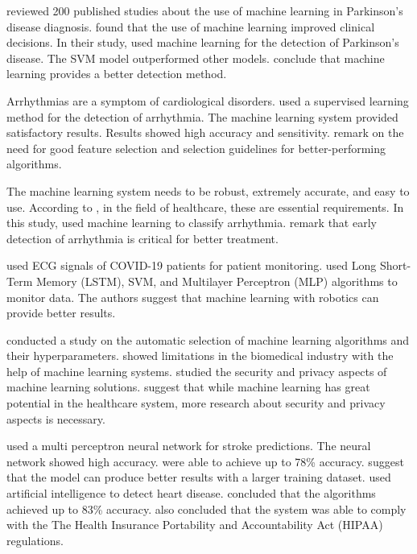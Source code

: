 \documentclass[a4paper,fleqn]{cas-dc}
\begin{document}
\cite*{ref_paper_27} reviewed 200 published studies about the use of machine learning in Parkinson's disease diagnosis. \citeauthor{ref_paper_27} found that the use of machine learning improved clinical decisions. In their study, \cite*{ref_paper_30} used machine learning for the detection of Parkinson's disease. The SVM model outperformed other models. \citeauthor{ref_paper_30} conclude that machine learning provides a better detection method.

Arrhythmias are a symptom of cardiological disorders. \cite*{ref_paper_28} used a supervised learning method for the detection of arrhythmia. The machine learning system provided satisfactory results. Results showed high accuracy and sensitivity. \citeauthor{ref_paper_28} remark on the need for good feature selection and selection guidelines for better-performing algorithms.

The machine learning system needs to be robust, extremely accurate, and easy to use. According to \cite*{ref_paper_4}, in the field of healthcare, these are essential requirements. In this study, \citeauthor{ref_paper_4} used machine learning to classify arrhythmia. \citeauthor{ref_paper_4} remark that early detection of arrhythmia is critical for better treatment.

\cite*{ref_paper_40} used ECG signals of COVID-19 patients for patient monitoring. \citeauthor{ref_paper_40} used Long Short-Term Memory (LSTM), SVM, and Multilayer Perceptron (MLP) algorithms to monitor data. The authors suggest that machine learning with robotics can provide better results.

\cite*{ref_paper_32} conducted a study on the automatic selection of machine learning algorithms and their hyperparameters. \citeauthor{ref_paper_32} showed limitations in the biomedical industry with the help of machine learning systems. \cite*{ref_paper_37} studied the security and privacy aspects of machine learning solutions. \citeauthor{ref_paper_37} suggest that while machine learning has great potential in the healthcare system, more research about security and privacy aspects is necessary.

\cite*{ref_paper_42} used a multi perceptron neural network for stroke predictions. The neural network showed high accuracy. \citeauthor{ref_paper_42} were able to achieve up to 78\% accuracy. \citeauthor{ref_paper_42} suggest that the model can produce better results with a larger training dataset. \cite*{ref_paper_41} used artificial intelligence to detect heart disease. \citeauthor{ref_paper_41} concluded that the algorithms achieved up to 83\% accuracy. \citeauthor{ref_paper_41} also concluded that the system was able to comply with the The Health Insurance Portability and Accountability Act (HIPAA) regulations.
\end{document}
